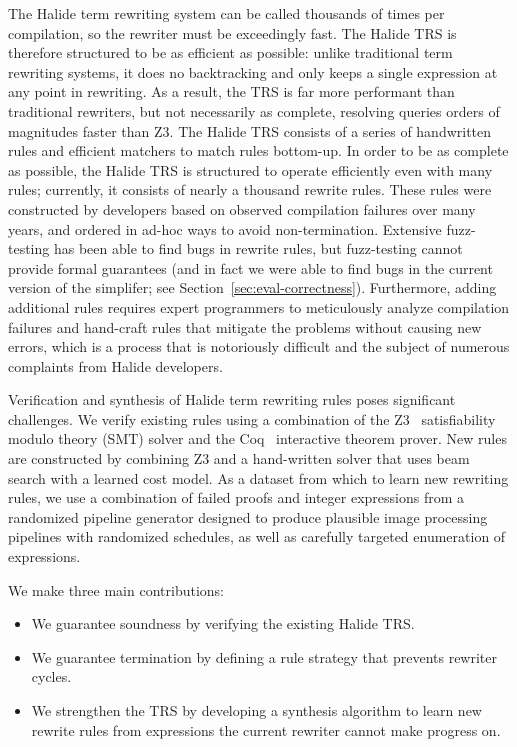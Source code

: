 \documentclass[sigplan,10pt,review,anonymous]{acmart}\settopmatter{printfolios=true,printccs=false,printacmref=false}
\begin{document}
The Halide term rewriting system can be called thousands of times per
compilation, so the rewriter must be exceedingly fast.  The Halide
TRS is therefore structured to be as efficient as possible: unlike traditional
term rewriting systems, it does no backtracking and only keeps a single expression
at any point in rewriting.  As a result, the TRS is far more performant than traditional
rewriters, but not necessarily as complete, resolving queries orders of magnitudes faster than Z3.
The Halide TRS consists of a series of handwritten rules and efficient matchers
to match rules bottom-up. In order to be as complete as possible, the Halide TRS is structured
to operate efficiently even with many rules; currently, it consists of nearly a thousand
rewrite rules.  These rules were constructed by developers based on
observed compilation failures over many years, and ordered in ad-hoc ways to
avoid non-termination. Extensive fuzz-testing has been able to find bugs in
rewrite rules, but fuzz-testing cannot provide formal guarantees (and in fact we
were able to find bugs in the current version of the simplifer;
see Section~\ref{sec:eval-correctness}). Furthermore, adding additional rules requires
expert programmers to meticulously analyze compilation failures and hand-craft
rules that mitigate the problems without causing new errors, which is a process
that is notoriously difficult and the subject of numerous complaints from
Halide developers.

Verification and synthesis
of Halide term rewriting rules poses significant challenges. We verify
existing rules using a combination of the Z3~\cite{de2008z3} satisfiability
modulo theory (SMT) solver and the Coq~\cite{coq19} interactive theorem prover. 
New rules are constructed by combining Z3 and a hand-written solver that uses beam
search with a learned cost model. As a dataset from which to learn new rewriting rules,
 we use a combination of failed proofs and integer expressions
from a randomized pipeline generator designed to produce plausible image processing
pipelines with randomized schedules, as well as carefully targeted enumeration
of expressions.

We make three main contributions:
\begin{itemize}
  \item We guarantee soundness by verifying the existing Halide TRS.
  \item We guarantee termination by defining a rule strategy that prevents rewriter cycles.
  \item We strengthen the TRS by developing a synthesis algorithm to learn new rewrite rules from expressions the current rewriter cannot make progress on.
\end{itemize}
\end{document}
